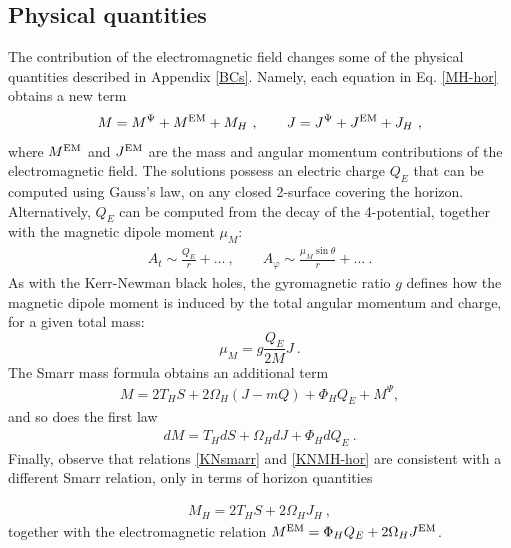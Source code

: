 \subsection{Physical quantities}
The contribution of the electromagnetic field changes some of the physical quantities described in Appendix \ref{BCs}.
Namely, each equation in Eq. \eqref{MH-hor} obtains a new term
\begin{eqnarray}
  \label{KNMH-hor}
  M=M^\Psi+M^{\rm EM}+M_H\ , \qquad J=J^\Psi+J^{\rm EM}+J_H\ ,
\end{eqnarray}
where $M^{\rm EM}$ and $J^{\rm EM}$ are the mass and angular momentum contributions of the electromagnetic field.
The solutions possess an electric charge $Q_E$ that can be computed using Gauss's law, 
on any closed 2-surface covering the horizon. 
Alternatively, $Q_E$ can be computed from the decay of the 4-potential, together with the magnetic dipole moment $\mu_M$:
 \begin{eqnarray}
 \label{asym-matter-fields}
  A_t\sim 
  \frac{Q_E}{r}+\dots \ , \qquad A_{\varphi}\sim \frac{\mu_M \sin \theta}{r}+\dots\
   .
 \end{eqnarray}
As with the Kerr-Newman black holes, the gyromagnetic ratio $g$ defines how the magnetic dipole moment 
is induced by the total angular momentum and charge, for a given total mass:
\begin{equation}
  \mu_M=g\frac{Q_E}{2M}J \ .
  \label{gyro}
\end{equation}
The Smarr mass formula obtains an additional term
%
\begin{eqnarray}
  \label{KNsmarr}
  M=2 T_H S +2\Omega_H (J-m Q) + \Phi_H Q_E+ M^\Psi,
\end{eqnarray}
and so does the first law
\begin{eqnarray}
\label{first-lawKN}
dM=T_H dS +\Omega_H dJ + \Phi_H dQ_E\ .
\end{eqnarray}
Finally, observe that relations \eqref{KNsmarr} and \eqref{KNMH-hor} are consistent with a different Smarr relation, only in terms of horizon quantities  

\begin{eqnarray} 
  M_H=2T_H S+2 \Omega_H J_H~,
\end{eqnarray}
together with the electromagnetic relation $M^{\rm EM}=\Phi_HQ_E+2\Omega_HJ^{\rm EM}$.

